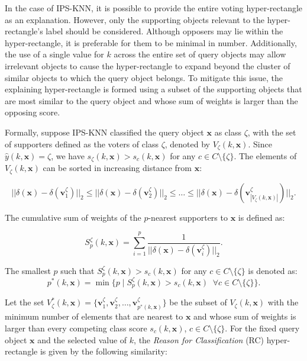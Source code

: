 \documentclass[a4paper,fleqn]{cas-sc}
\begin{document}
In the case of IPS-KNN, it is possible to provide the entire voting hyper-rectangle as an explanation. However, only the supporting objects relevant to the hyper-rectangle's label should be considered. Although opposers may lie within the hyper-rectangle, it is preferable for them to be minimal in number. Additionally, the use of a single value for $k$ across the entire set of query objects may allow irrelevant objects to cause the hyper-rectangle to expand beyond the cluster of similar objects to which the query object belongs. To mitigate this issue, the explaining hyper-rectangle is formed using a subset of the supporting objects that are most similar to the query object and whose sum of weights is larger than the opposing score.


Formally, suppose IPS-KNN classified the query object \(\mathbf{x}\) as class \(\zeta\), with the set of supporters defined as the voters of class \(\zeta\), denoted by \(V_\zeta(k,\mathbf{x})\). Since \(\hat{y}(k,\mathbf{x}) = \zeta\), we have \(s_\zeta(k,\mathbf{x}) > s_c(k,\mathbf{x})\) for any \(c \in C \setminus \{\zeta\}\). The elements of \(V_\zeta(k,\mathbf{x})\) can be sorted in increasing distance from \(\mathbf{x}\):

\begin{equation}
    ||\delta(\mathbf{x}) - \delta(\mathbf{v}_1^\zeta)||_2 \leq ||\delta(\mathbf{x}) - \delta(\mathbf{v}_2^\zeta)||_2 \leq \dotso \leq ||\delta(\mathbf{x}) - \delta(\mathbf{v}_{|V_\zeta(k, \mathbf{x})|}^\zeta)||_2 .
\end{equation}

The cumulative sum of weights of the $p$-nearest supporters to $\mathbf{x}$ is defined as:

\begin{equation}
    S_p^\zeta(k, \mathbf{x}) = \sum_{i = 1}^{p}  \frac{1}{||\delta(\mathbf{x}) - \delta(\mathbf{v}_i^\zeta)||_2} .
\end{equation}

The smallest $p$ such that $S_p^\zeta(k, \mathbf{x}) > s_c(k, \mathbf{x})$ for any $c \in C \setminus \{\zeta\}$ is denoted as:
\begin{equation}
    p^*(k,\mathbf{x}) = \min \{p \mid S_p^\zeta(k, \mathbf{x}) > s_c(k, \mathbf{x}) \;\; \forall c \in C \setminus \{\zeta\}\}.
\end{equation}

Let the set \(V_\zeta^*(k, \mathbf{x}) = \{\mathbf{v}_1^\zeta, \mathbf{v}_2^\zeta, \dotso, \mathbf{v}_{p^*(k,\mathbf{x})}^\zeta\}\) be the subset of \(V_\zeta(k, \mathbf{x})\) with the minimum number of elements that are nearest to \(\mathbf{x}\) and whose sum of weights is larger than every competing class score \(s_c(k,\mathbf{x})\), \(c \in C \setminus \{\zeta\}\). For the fixed query object \(\mathbf{x}\) and the selected value of \(k\), the \textit{Reason for Classification} (RC) hyper-rectangle is given by the following similarity:
\end{document}

